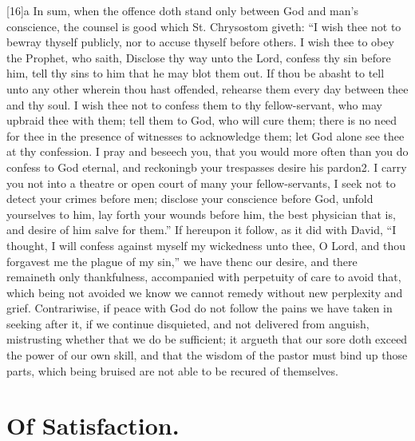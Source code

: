 [16]a In sum, when the offence doth stand only between God and man’s conscience, the counsel is good which St. Chrysostom giveth: “I wish thee not to bewray thyself publicly, nor to accuse thyself before others. I wish thee to obey the Prophet, who saith, Disclose thy way unto the Lord, confess thy sin before him, tell thy sins to him that he may blot them out. If thou be abasht to tell unto any other wherein thou hast offended, rehearse them every day between thee and thy soul. I wish thee not to confess them to thy fellow-servant, who may upbraid thee with them; tell them to God, who will cure them; there is no need for thee in the presence of witnesses to acknowledge them; let God alone see thee at thy confession. I pray and beseech you, that you would more often than you do confess to God eternal, and reckoningb your trespasses desire his pardon2. I carry you not into a theatre or open court of many your fellow-servants, I seek not to detect your crimes before men; disclose your conscience before God, unfold yourselves to him, lay forth your wounds before him, the best physician that is, and desire of him salve for them.” If hereupon it follow, as it did with David, “I thought, I will confess against myself my wickedness unto thee, O Lord, and thou forgavest me the plague of my sin,” we have thenc our desire, and there  remaineth only thankfulness, accompanied with perpetuity of care to avoid that, which being not avoided we know we cannot remedy without new perplexity and grief. Contrariwise, if peace with God do not follow the pains we have taken in seeking after it, if we continue disquieted, and not delivered from anguish, mistrusting whether that we do be sufficient; it argueth that our sore doth exceed the power of our own skill, and that the wisdom of the pastor must bind up those parts, which being bruised are not able to be recured of themselves.

\section*{Of Satisfaction.}

